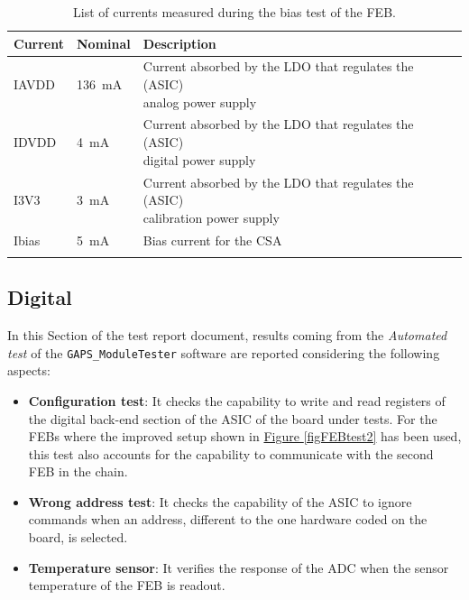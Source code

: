 \begin{table}[ht]
    \centering
    \begin{tabular}{l l l} 
         \Xhline{2\arrayrulewidth}
         Current & Nominal & Description \T\B \\
         \hline
         IAVDD & \SI{136}{\milli\ampere} & \makecell[l]{Current absorbed by the LDO that regulates the (ASIC) \T \\ analog power supply \B} \\
         IDVDD & \SI{4}{\milli\ampere} & \makecell[l]{Current absorbed by the LDO that regulates the (ASIC) \T \\ digital power supply \B} \\ 
         I3V3 & \SI{3}{\milli\ampere} & \makecell[l]{Current absorbed by the LDO that regulates the (ASIC) \T \\ calibration power supply \B} \\ 
         Ibias & \SI{5}{\milli\ampere} & Bias current for the CSA \T\B \\ 
         \Xhline{2\arrayrulewidth}
    \end{tabular}
    \caption{List of currents measured during the bias test of the FEB.}
    \label{tabcurrents}
\end{table}


\subsection{Digital}

In this Section of the test report document, results coming from the \textit{Automated test} of the \texttt{GAPS\_ModuleTester} software  are reported considering the following aspects:

\begin{itemize}
    \itemsep0em 
    \item \textbf{Configuration test}: It checks the capability to write and read registers of the digital back-end section of the ASIC of the board under tests. For the FEBs where the improved setup shown in \hyperref[figFEBtest2]{Figure \ref{figFEBtest2}} has been used, this test also accounts for the capability to communicate with the second FEB in the chain.
    \item \textbf{Wrong address test}: It checks the capability of the ASIC to ignore commands when an address, different to the one hardware coded on the board, is selected.
    \item \textbf{Temperature sensor}: It verifies the response of the ADC when the sensor temperature of the FEB is readout.
    
\end{itemize}

